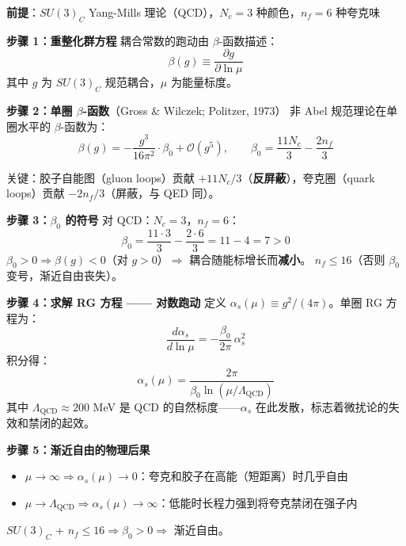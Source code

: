 \begin{derivationbox}

\noindent\textbf{前提}：$SU(3)_C$ Yang-Mills 理论（QCD），$N_c=3$ 种颜色，$n_f=6$ 种夸克味

\noindent\textbf{步骤 1：重整化群方程}
耦合常数的跑动由 $\beta$-函数描述：
\begin{equation}
\beta(g) \equiv \frac{\partial g}{\partial \ln\mu}
\end{equation}
其中 $g$ 为 $SU(3)_C$ 规范耦合，$\mu$ 为能量标度。

\noindent\textbf{步骤 2：单圈 $\beta$-函数}{（Gross \& Wilczek; Politzer, 1973）}
非 Abel 规范理论在单圈水平的 $\beta$-函数为：
\begin{equation}
\beta(g) = -\frac{g^3}{16\pi^2} \cdot \beta_0 + \mathcal{O}(g^5),\qquad
\beta_0 = \frac{11N_c}{3} - \frac{2n_f}{3}
\end{equation}

关键：胶子自能图（gluon loops）贡献 $+11N_c/3$（\textbf{反屏蔽}），夸克圈（quark loops）贡献 $-2n_f/3$（屏蔽，与 QED 同）。

\noindent\textbf{步骤 3：$\beta_0$ 的符号}
对 QCD：$N_c=3$，$n_f=6$：
\begin{equation}
\beta_0 = \frac{11\cdot 3}{3} - \frac{2\cdot 6}{3} = 11 - 4 = 7 > 0
\end{equation}
$\beta_0 > 0 \Rightarrow \beta(g) < 0$（对 $g>0$）$\Rightarrow$ 耦合随能标增长而\textbf{减小}。\fbox{[N]} $n_f \leq 16$（否则 $\beta_0$ 变号，渐近自由丧失）。

\noindent\textbf{步骤 4：求解 RG 方程 —— 对数跑动}
定义 $\alpha_s(\mu) \equiv g^2/(4\pi)$。单圈 RG 方程为：
\begin{equation}
\frac{d\alpha_s}{d\ln\mu} = -\frac{\beta_0}{2\pi}\,\alpha_s^2
\end{equation}
积分得：
\begin{equation}
\alpha_s(\mu) = \frac{2\pi}{\beta_0\ln(\mu/\Lambda_{\text{QCD}})}
\end{equation}
其中 $\Lambda_{\text{QCD}} \approx 200$ MeV 是 QCD 的自然标度——$\alpha_s$ 在此发散，标志着微扰论的失效和禁闭的起效。

\noindent\textbf{步骤 5：渐近自由的物理后果}
\begin{itemize}
  \item $\mu \to \infty \Rightarrow \alpha_s(\mu) \to 0$：夸克和胶子在高能（短距离）时几乎自由
  \item $\mu \to \Lambda_{\text{QCD}} \Rightarrow \alpha_s(\mu) \to \infty$：低能时长程力强到将夸克禁闭在强子内
\end{itemize}

\fbox{[S]} $SU(3)_C$ + $n_f \leq 16 \Rightarrow \beta_0 > 0 \Rightarrow$ 渐近自由。

\end{derivationbox}

